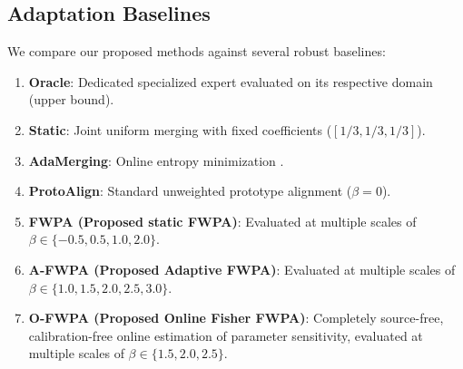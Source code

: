 \documentclass{article}
\theoremstyle{plain}
\theoremstyle{definition}
\theoremstyle{remark}
\begin{document}
\subsection{Adaptation Baselines}
We compare our proposed methods against several robust baselines:
\begin{enumerate}
    \item \textbf{Oracle}: Dedicated specialized expert evaluated on its respective domain (upper bound).
    \item \textbf{Static}: Joint uniform merging with fixed coefficients ($[1/3, 1/3, 1/3]$).
    \item \textbf{AdaMerging}: Online entropy minimization \citep{yang2024adamerging}.
    \item \textbf{ProtoAlign}: Standard unweighted prototype alignment \citep{sub8_anon} ($\beta = 0$).
    \item \textbf{FWPA (Proposed static FWPA)}: Evaluated at multiple scales of $\beta \in \{-0.5, 0.5, 1.0, 2.0\}$.
    \item \textbf{A-FWPA (Proposed Adaptive FWPA)}: Evaluated at multiple scales of $\beta \in \{1.0, 1.5, 2.0, 2.5, 3.0\}$.
    \item \textbf{O-FWPA (Proposed Online Fisher FWPA)}: Completely source-free, calibration-free online estimation of parameter sensitivity, evaluated at multiple scales of $\beta \in \{1.5, 2.0, 2.5\}$.
\end{enumerate}
\end{document}
